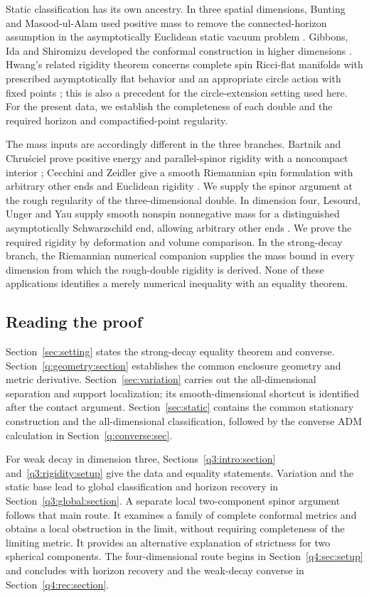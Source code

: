 Static classification has its own ancestry. In three spatial
dimensions, Bunting and Masood-ul-Alam used positive mass to remove
the connected-horizon assumption in the asymptotically Euclidean
static vacuum problem \cite{BuntingMasoodUlAlam1987}.
Gibbons, Ida and Shiromizu developed the conformal construction in
higher dimensions \cite[Section~2]{GibbonsIdaShiromizu2002}.
Hwang's related rigidity theorem concerns complete spin Ricci-flat
manifolds with prescribed asymptotically flat behavior and an
appropriate circle action with fixed points
\cite{Hwang1998}; this is also a precedent for the circle-extension
setting used here. For the present data, we establish the completeness
of each double and the required horizon and compactified-point regularity.

The mass inputs are accordingly different in the three branches.
Bartnik and Chru\'sciel prove positive energy and parallel-spinor
rigidity with a noncompact interior
\cite[Theorem~11.2]{BartnikChrusciel2005}; Cecchini and Zeidler give a
smooth Riemannian spin formulation with arbitrary other ends and
Euclidean rigidity \cite[Theorem~B]{CecchiniZeidler2024}.
We supply the spinor argument at the rough regularity of the
three-dimensional double. In dimension four, Lesourd, Unger and Yau
supply smooth nonspin nonnegative mass for a distinguished
asymptotically Schwarzschild end, allowing arbitrary other ends
\cite[Theorem~1.2 and Definition~1.9, arXiv version~1]{LesourdUngerYau2021}.
We prove the required rigidity by deformation and volume comparison.
In the strong-decay branch, the Riemannian numerical companion
supplies the mass bound in every dimension from which the rough-double
rigidity is derived. None of these applications identifies a merely numerical
inequality with an equality theorem.

\subsection{Reading the proof}

Section~\ref{sec:setting} states the strong-decay equality theorem and
converse. Section~\ref{q:geometry:section} establishes the common
enclosure geometry and metric derivative.
Section~\ref{sec:variation} carries out the all-dimensional separation
and support localization; its smooth-dimensional shortcut is
identified after the contact argument. Section~\ref{sec:static}
contains the common stationary construction and the all-dimensional
classification, followed by the converse ADM calculation in
Section~\ref{q:converse:sec}.

For weak decay in dimension three, Sections~\ref{q3:intro:section}
and~\ref{q3:rigidity:setup} give the data and equality statements.
Variation and the static base lead to global classification and
horizon recovery in Section~\ref{q3:global:section}. A separate local
two-component spinor argument follows that main route. It examines a
family of complete conformal metrics and obtains a local obstruction
in the limit, without requiring completeness of the limiting metric.
It provides an alternative explanation of strictness for two spherical
components. The four-dimensional route begins in
Section~\ref{q4:sec:setup} and concludes with horizon recovery and the
weak-decay converse in Section~\ref{q4:rec:section}.
